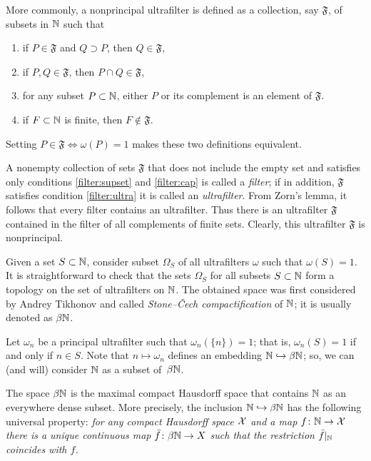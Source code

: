 More commonly, a nonprincipal ultrafilter is defined as a collection, say $\mathfrak{F}$, of subsets in $\mathbb{N}$ such that
\begin{enumerate}
\item\label{filter:supset} if $P\in \mathfrak{F}$ and $Q\supset P$, then $Q\in \mathfrak{F}$,
\item\label{filter:cap} if $P, Q\in \mathfrak{F}$, then $P\cap Q\in \mathfrak{F}$,
\item\label{filter:ultra} for any subset $P\subset\mathbb{N}$, either $P$ or its complement is an element of $\mathfrak{F}$.
\item\label{filter:non-prin} if $F\subset \mathbb{N} $ is finite, then $F\notin \mathfrak{F}$.
\end{enumerate}
Setting $P\in\mathfrak{F}\Leftrightarrow\omega(P)=1$ makes these two definitions equivalent.

A nonempty collection of sets $\mathfrak{F}$ that does not include the empty set and satisfies only conditions \ref{filter:supset} and \ref{filter:cap} is called a \emph{filter}; 
if in addition, $\mathfrak{F}$ satisfies condition \ref{filter:ultra} it is called an \emph{ultrafilter}.
From Zorn's lemma, it follows that every filter contains an ultrafilter.
Thus there is an ultrafilter $\mathfrak{F}$ contained in the filter of all complements of finite sets.
Clearly, this ultrafilter $\mathfrak{F}$ is nonprincipal.


Given a set $S\subset \mathbb{N}$, consider subset $\Omega_S$ of all ultrafilters $\omega$ such that $\omega(S)=1$.
It is straightforward to check that the sets $\Omega_S$ for all subsets $S\subset \mathbb{N}$ form a topology on the set of ultrafilters on $\mathbb{N}$. 
The obtained space was first considered by Andrey Tikhonov and called \emph{Stone--\v{C}ech compactification} of $\mathbb{N}$;
it is usually denoted as $\beta\mathbb{N}$.

Let $\omega_n$ be a principal ultrafilter such that $\omega_n(\{n\})=1$; that is, $\omega_n(S)=1$ if and only if $n\in S$.
Note that $n\mapsto\omega_n$ defines an embedding $\mathbb{N}\hookrightarrow\beta\mathbb{N}$;
so, we can (and will) consider $\mathbb{N}$ as a subset of~$\beta\mathbb{N}$.

The space $\beta\mathbb{N}$ is the maximal compact Hausdorff space that contains $\mathbb{N}$  as an everywhere dense subset.
More precisely, the inclusion $\mathbb{N}\hookrightarrow\beta\mathbb{N}$ has the following universal property:
\textit{for any compact Hausdorff space $\mathcal{X}$ 
and a map $f\colon\mathbb{N}\to \mathcal{X}$ there is a unique continuous map $\bar f\colon\beta\mathbb{N}\to X$ such that the restriction $\bar f|_{\mathbb{N}}$ coincides with $f$.} 

